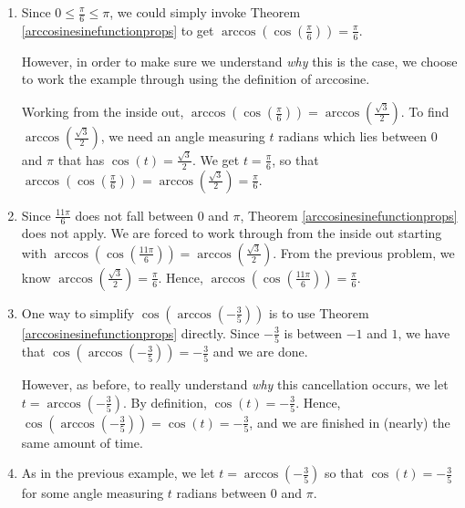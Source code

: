 \documentclass{ximera}
\begin{document}
\begin{example}
\begin{explanation}
\begin{enumerate}
\begin{enumerate}
\item  Since $0 \leq \frac{\pi}{6} \leq \pi$, we could simply invoke Theorem \ref{arccosinesinefunctionprops} to get $\arccos\left( \cos\left(\frac{\pi}{6}\right)\right) = \frac{\pi}{6}$.  

 

However, in order to make sure we understand \textit{why} this is the case, we choose to work the example through using the definition of arccosine.  

 

Working from the inside out,  $\arccos\left( \cos\left(\frac{\pi}{6}\right)\right) = \arccos\left( \frac{\sqrt{3}}{2}\right)$.  To find $\arccos\left( \frac{\sqrt{3}}{2}\right)$, we need an angle measuring  $t$ radians which lies between $0$ and $\pi$ that has $\cos(t) = \frac{\sqrt{3}}{2}$.   We get $t = \frac{\pi}{6}$, so that  $\arccos\left( \cos\left(\frac{\pi}{6}\right)\right) =  \arccos\left( \frac{\sqrt{3}}{2}\right) = \frac{\pi}{6}$.

\item Since $\frac{11\pi}{6}$ does not fall between $0$ and $\pi$, Theorem \ref{arccosinesinefunctionprops} does not apply.  We are forced to work through from the inside out starting with  $\arccos\left( \cos\left(\frac{11\pi}{6}\right)\right) = \arccos\left(\frac{\sqrt{3}}{2}\right)$.  From the previous problem, we know $\arccos\left(\frac{\sqrt{3}}{2}\right) = \frac{\pi}{6}$.  Hence,  $\arccos\left( \cos\left(\frac{11\pi}{6}\right)\right) = \frac{\pi}{6}$.

\item  One way to simplify  $\cos\left(\arccos\left(-\frac{3}{5}\right)\right)$ is to use Theorem \ref{arccosinesinefunctionprops} directly.  Since $-\frac{3}{5}$ is between $-1$ and $1$, we have that $\cos\left(\arccos\left(-\frac{3}{5}\right)\right) = -\frac{3}{5}$ and we are done.  

 

However, as before, to really understand \textit{why} this cancellation occurs, we  let $t = \arccos\left(-\frac{3}{5}\right)$.  By definition,  $\cos(t) = -\frac{3}{5}$. Hence, $\cos\left(\arccos\left(-\frac{3}{5}\right)\right) = \cos(t) = -\frac{3}{5}$, and we are finished in (nearly) the same amount of time.

\item  As in the previous example, we let $t = \arccos\left(-\frac{3}{5}\right)$ so that  $\cos(t) = -\frac{3}{5}$ for some angle measuring $t$  radians between $0$ and $\pi$.


\end{enumerate}
\end{enumerate}
\end{explanation}
\end{example}
\end{document}
